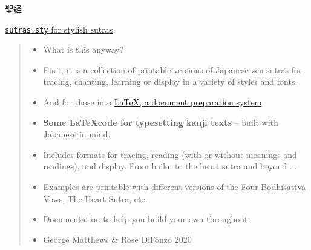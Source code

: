 \documentclass[letterpaper]{article}
\begin{document}
	\vspace*{1cm}
	
	 {\centering\Huge 聖経 
		
		\vspace*{0.25cm}
		
		\href{https://github.com/gwmatthews/TheFourVows}{\texttt{sutras.sty}
		{\small for stylish sutras}}
		
		
	}

\vspace*{0.5cm}
	    \begin{quote}
	    	
	    	\begin{itemize}
	    		\item[{\fontsize{20}{20}{法}}] What is this anyway?
	    		\item[] First, it is a collection of printable versions of Japanese zen sutras for tracing, chanting, learning or display in a variety of styles and fonts. 
	    	\end{itemize}
	    	
	    	\begin{itemize}
	    		\item[{\fontsize{20}{20}{法}}] And for those into \href{https://www.latex-project.org/about/}{ \LaTeX, a document preparation system}
	    		\item[]  \textbf{Some \LaTeX code for typesetting kanji texts} -- built with Japanese in mind.
	    		\item[] Includes formats for tracing, reading (with or without meanings and readings), and display. From haiku to the heart sutra and beyond $\ldots$
	    		\item[] Examples are printable with different versions of the Four Bodhisattva Vows, The Heart Sutra, etc.
	    		\item[] Documentation to help you build your own throughout.
	    		\item[] \cc George Matthews \& Rose DiFonzo 2020
	    	\end{itemize}
	    \end{quote}
	    
	    
	    
\vspace*{1cm}
	
\end{document}
